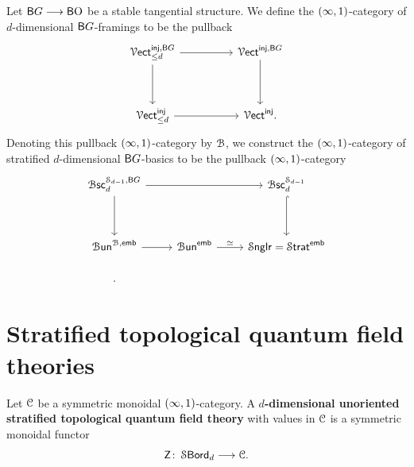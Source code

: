 \begin{definition}
    Let $\mathsf B G \longrightarrow \operatorname{{\mathsf BO}}$ be a stable tangential structure. We define the $(\operatorname{\infty},1)$-category of $d$-dimensional $\mathsf B G$-framings to be the pullback
    \begin{equation}
        \begin{tikzcd}[ampersand replacement=\&]
            {\Vect^{\inj,\sB G}_{\leq d}} \&\& {\Vect^{\inj, \sB G}} \\
            \\
            {\Vect^{\inj}_{\leq d}} \&\& {\Vect^{\inj}}.
            \arrow[from=1-1, to=1-3]
            \arrow[from=1-1, to=3-1]
            \arrow[from=1-3, to=3-3]
            \arrow[from=3-1, to=3-3]
        \end{tikzcd}
    \end{equation}
    Denoting this pullback $(\operatorname{\infty},1)$-category by $\mathcal B$, we construct the $(\operatorname{\infty},1)$-category of stratified $d$-dimensional $\mathsf B G$-basics to be the pullback $(\operatorname{\infty},1)$-category 
    \begin{equation}
        \begin{tikzcd}[ampersand replacement=\&]
            {\Bsc_{d}^{\cS_{d-1}, \sB G}} \&\& {\Bsc^{\cS_{d-1}}_{d}} \\
            \\
            {\Bun^{\cB,\emb}} \& {\Bun^{\emb}} \& {\Snglr = \Strat^{\emb}} \\
            {.}
            \arrow[from=1-1, to=1-3]
            \arrow[from=1-1, to=3-1]
            \arrow[hook, from=1-3, to=3-3]
            \arrow[from=3-1, to=3-2]
            \arrow["\simeq", from=3-2, to=3-3]
        \end{tikzcd}
    \end{equation}
\end{definition}


\section{Stratified topological quantum field theories}

\begin{definition}
    Let $\mathcal C$ be a symmetric monoidal $(\operatorname{\infty},1)$-category. A \textbf{$d$-dimensional unoriented stratified topological quantum field theory} with values in $\mathcal C$ is a symmetric monoidal functor 
    \begin{equation}
        \mathsf Z \colon \operatorname{\mathcal S\mathsf{Bord}}_{d} \longrightarrow \mathcal C.
    \end{equation}
\end{definition}


